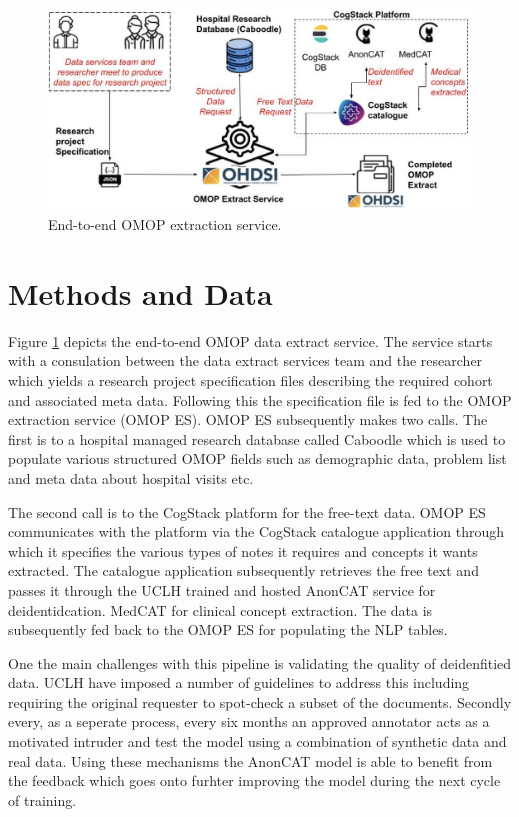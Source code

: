 \documentclass[11pt]{article}
\begin{document}
\begin{figure}[h]
\centering
\includegraphics[width=0.8\linewidth]{pipeline.png}
\caption{End-to-end OMOP extraction service.}
\label{pipeline}
\end{figure}



\section{Methods and Data}

Figure \ref{pipeline} depicts the end-to-end OMOP data extract service. The service starts with a consulation between the data extract services team and the researcher which yields a research project specification files describing the required cohort and associated meta data. Following this the specification file is fed to the OMOP extraction service (OMOP ES). OMOP ES subsequently makes two calls. The first is to a hospital managed research database called Caboodle which is used to populate various structured OMOP fields such as demographic data, problem list and meta data about hospital visits etc. 

The second call is to the CogStack platform \cite{cogstack-uclh} for the free-text data. OMOP ES communicates with the platform via the CogStack catalogue application through which it specifies the various types of notes it requires and concepts it wants extracted. The catalogue application subsequently retrieves the free text and passes it through the UCLH trained and hosted AnonCAT service \cite{10337202} for deidentidcation. MedCAT for clinical concept extraction. The data is subsequently fed back to the OMOP ES for populating the NLP tables.

One the main challenges with this pipeline is validating the quality of deidenfitied data. UCLH have imposed a number of guidelines to address this including requiring the original requester to spot-check a subset of the documents. Secondly every, as a seperate process, every six months an approved annotator acts as a motivated intruder and test the model using a combination of synthetic data and real data. Using these mechanisms the AnonCAT model is able to benefit from the feedback which goes onto furhter improving the model during the next cycle of training. 
\end{document}
